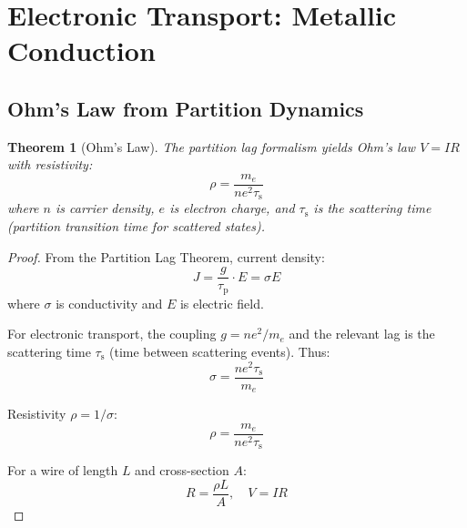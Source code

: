 \documentclass[twocolumn,10pt]{article}
\newtheorem{theorem}{Theorem}[section]
\theoremstyle{definition}
\theoremstyle{remark}
\newcommand{\taup}{\tau_{\mathrm{p}}}
\newcommand{\taus}{\tau_{\mathrm{s}}}
\begin{document}
\section{Electronic Transport: Metallic Conduction}
\label{sec:electronic}

\subsection{Ohm's Law from Partition Dynamics}

\begin{theorem}[Ohm's Law]
\label{thm:ohm}
The partition lag formalism yields Ohm's law $V = IR$ with resistivity:
\begin{equation}
\boxed{\rho = \frac{m_e}{ne^2\taus}}
\end{equation}
where $n$ is carrier density, $e$ is electron charge, and $\taus$ is the scattering time (partition transition time for scattered states).
\end{theorem}

\begin{proof}
From the Partition Lag Theorem, current density:
\begin{equation}
J = \frac{g}{\taup} \cdot E = \sigma E
\end{equation}
where $\sigma$ is conductivity and $E$ is electric field.

For electronic transport, the coupling $g = ne^2/m_e$ and the relevant lag is the scattering time $\taus$ (time between scattering events). Thus:
\begin{equation}
\sigma = \frac{ne^2\taus}{m_e}
\end{equation}

Resistivity $\rho = 1/\sigma$:
\begin{equation}
\rho = \frac{m_e}{ne^2\taus}
\end{equation}

For a wire of length $L$ and cross-section $A$:
\begin{equation}
R = \frac{\rho L}{A}, \quad V = IR
\end{equation}
\end{proof}
\end{document}
